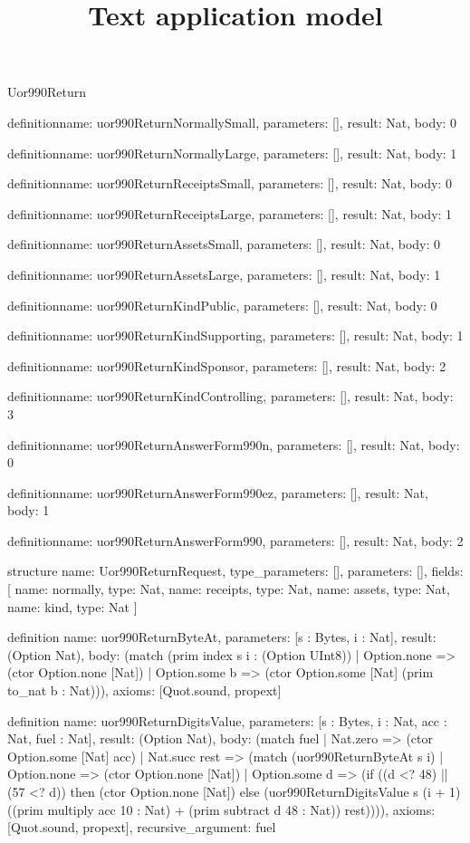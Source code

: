 \begin{lexlean}{Uor990Return}
\title{Text application model}
\begin{semanticmodule}
definition{name: uor990ReturnNormallySmall, parameters: [], result: Nat, body: 0}

definition{name: uor990ReturnNormallyLarge, parameters: [], result: Nat, body: 1}

definition{name: uor990ReturnReceiptsSmall, parameters: [], result: Nat, body: 0}

definition{name: uor990ReturnReceiptsLarge, parameters: [], result: Nat, body: 1}

definition{name: uor990ReturnAssetsSmall, parameters: [], result: Nat, body: 0}

definition{name: uor990ReturnAssetsLarge, parameters: [], result: Nat, body: 1}

definition{name: uor990ReturnKindPublic, parameters: [], result: Nat, body: 0}

definition{name: uor990ReturnKindSupporting, parameters: [], result: Nat, body: 1}

definition{name: uor990ReturnKindSponsor, parameters: [], result: Nat, body: 2}

definition{name: uor990ReturnKindControlling, parameters: [], result: Nat, body: 3}

definition{name: uor990ReturnAnswerForm990n, parameters: [], result: Nat, body: 0}

definition{name: uor990ReturnAnswerForm990ez, parameters: [], result: Nat, body: 1}

definition{name: uor990ReturnAnswerForm990, parameters: [], result: Nat, body: 2}

structure{
  name: Uor990ReturnRequest,
  type_parameters: [],
  parameters: [],
  fields: [
    {name: normally, type: Nat},
    {name: receipts, type: Nat},
    {name: assets, type: Nat},
    {name: kind, type: Nat}
  ]
}

definition{
  name: uor990ReturnByteAt,
  parameters: [s : Bytes, i : Nat],
  result: (Option Nat),
  body: (match (prim index s i : (Option UInt8))
    | Option.none => (ctor Option.none [Nat])
    | Option.some b => (ctor Option.some [Nat] (prim to_nat b : Nat))),
  axioms: [Quot.sound, propext]
}

definition{
  name: uor990ReturnDigitsValue,
  parameters: [s : Bytes, i : Nat, acc : Nat, fuel : Nat],
  result: (Option Nat),
  body: (match fuel
    | Nat.zero => (ctor Option.some [Nat] acc)
    | Nat.succ rest => (match (uor990ReturnByteAt s i)
      | Option.none => (ctor Option.none [Nat])
      | Option.some d => (if ((d <? 48) || (57 <? d)) then (ctor Option.none [Nat]) else (uor990ReturnDigitsValue s (i + 1) ((prim multiply acc 10 : Nat) + (prim subtract d 48 : Nat)) rest)))),
  axioms: [Quot.sound, propext],
  recursive_argument: fuel
}


\end{semanticmodule}
\end{lexlean}
